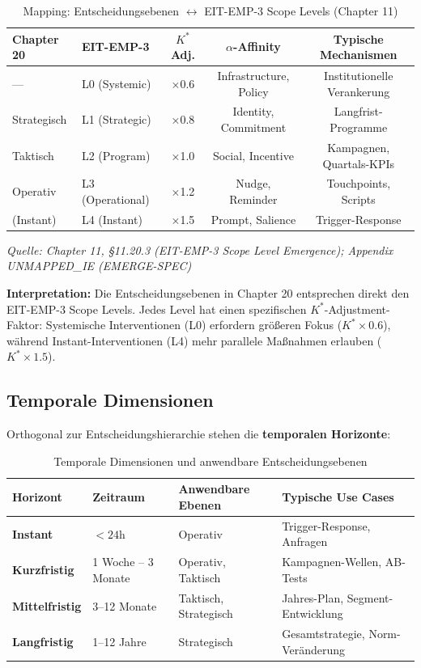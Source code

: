 \begin{table}[htbp]
\centering
\caption{Mapping: Entscheidungsebenen $\leftrightarrow$ EIT-EMP-3 Scope Levels (Chapter 11)}
\label{tab:20-scope-mapping}
\renewcommand{\arraystretch}{1.4}
\small
\begin{tabular}{@{}llccc@{}}
\toprule
\textbf{Chapter 20} & \textbf{EIT-EMP-3} & \textbf{$K^*$ Adj.} & \textbf{$\alpha$-Affinity} & \textbf{Typische Mechanismen} \\
\midrule
--- & L0 (Systemic) & ×0.6 & Infrastructure, Policy & Institutionelle Verankerung \\
Strategisch & L1 (Strategic) & ×0.8 & Identity, Commitment & Langfrist-Programme \\
Taktisch & L2 (Program) & ×1.0 & Social, Incentive & Kampagnen, Quartals-KPIs \\
Operativ & L3 (Operational) & ×1.2 & Nudge, Reminder & Touchpoints, Scripts \\
(Instant) & L4 (Instant) & ×1.5 & Prompt, Salience & Trigger-Response \\
\bottomrule
\end{tabular}

\vspace{0.2cm}
\footnotesize
\textit{Quelle: Chapter 11, §11.20.3 (EIT-EMP-3 Scope Level Emergence); Appendix UNMAPPED_IE (EMERGE-SPEC)}
\end{table}

\textbf{Interpretation:} Die Entscheidungsebenen in Chapter 20 entsprechen direkt den EIT-EMP-3 Scope Levels. Jedes Level hat einen spezifischen $K^*$-Adjustment-Faktor: Systemische Interventionen (L0) erfordern größeren Fokus ($K^* \times 0.6$), während Instant-Interventionen (L4) mehr parallele Maßnahmen erlauben ($K^* \times 1.5$).

\subsection{Temporale Dimensionen}
\label{sec:20-temporal-dimensions}

Orthogonal zur Entscheidungshierarchie stehen die \textbf{temporalen Horizonte}:

\begin{table}[htbp]
\centering
\caption{Temporale Dimensionen und anwendbare Entscheidungsebenen}
\label{tab:20-temporal-dimensions}
\renewcommand{\arraystretch}{1.4}
\small
\begin{tabular}{@{}llll@{}}
\toprule
\textbf{Horizont} & \textbf{Zeitraum} & \textbf{Anwendbare Ebenen} & \textbf{Typische Use Cases} \\
\midrule
\textbf{Instant} & $< 24$h & Operativ & Trigger-Response, Anfragen \\
\textbf{Kurzfristig} & 1 Woche -- 3 Monate & Operativ, Taktisch & Kampagnen-Wellen, AB-Tests \\
\textbf{Mittelfristig} & 3--12 Monate & Taktisch, Strategisch & Jahres-Plan, Segment-Entwicklung \\
\textbf{Langfristig} & 1--12 Jahre & Strategisch & Gesamtstrategie, Norm-Veränderung \\
\bottomrule
\end{tabular}
\end{table}

